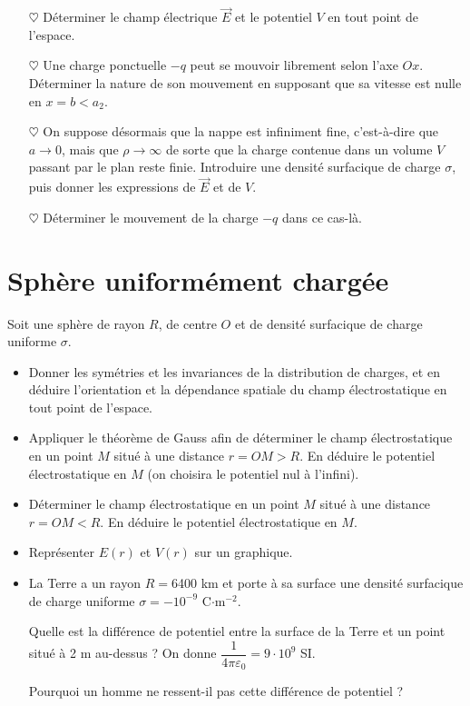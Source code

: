 \documentclass{report}
\begin{document}
\begin{itemize}


	\item[$\heartsuit$] Déterminer le champ électrique $\vec{E}$ et le potentiel $V$ en tout point de l'espace.
	
	\item[$\heartsuit$] Une charge ponctuelle $-q$ peut se mouvoir librement selon l'axe $Ox$. Déterminer la nature de son mouvement en supposant que sa vitesse est nulle en $x=b<a_2$.
	
	\item[$\heartsuit$] On suppose désormais que la nappe est infiniment fine, c'est-à-dire que $a\longrightarrow0$, mais que $\rho\longrightarrow\infty$ de sorte que la charge contenue dans un volume $V$ passant par le plan reste finie. Introduire une densité surfacique de charge $\sigma$, puis donner les expressions de $\vec{E}$ et de $V$.
	
	\item[$\heartsuit$] Déterminer le mouvement de la charge $-q$ dans ce cas-là. 
	
\end{itemize}

\newpage

\section*{Sphère uniformément chargée}
Soit une sphère de rayon $R$, de centre $O$ et de densité surfacique de charge uniforme $\sigma$.

\begin{itemize}
\item Donner les symétries et les invariances de la distribution de charges, et en déduire l'orientation et la dépendance spatiale du champ électrostatique en tout point de l'espace.
\item Appliquer le théorème de Gauss afin de déterminer le champ électrostatique en un point $M$ situé à une distance $r=OM>R$. En déduire le potentiel électrostatique en $M$ (on choisira le potentiel nul à l'infini).
\item Déterminer le champ électrostatique en un point $M$ situé à une distance $r=OM<R$. En déduire le potentiel électrostatique en $M$.
\item Représenter $E(r)$ et $V(r)$ sur un graphique.
\item La Terre a un rayon $R=$6400 km et porte à sa surface une densité surfacique de charge uniforme $\sigma=-10^{-9}$ C$\cdot$m$^{-2}$.

Quelle est la différence de potentiel entre la surface de la Terre et un point situé à 2 m au-dessus ? On donne $\dfrac{1}{4\pi\varepsilon_0}=9\cdot 10^9$ SI.

Pourquoi un homme ne ressent-il pas cette différence de potentiel ? %
\end{itemize}
\end{document}

